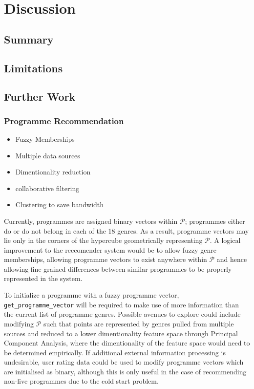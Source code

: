 \section{Discussion}
	\subsection{Summary}
	\subsection{Limitations}
	\subsection{Further Work}
		\subsubsection{Programme Recommendation}
		\label{sec:further_work_recommender}
		\begin{itemize}
			\item Fuzzy Memberships
			\item Multiple data sources
			\item Dimentionality reduction
			\item collaborative filtering
			\item Clustering to save bandwidth
		\end{itemize}

		Currently, programmes are assigned binary vectors within $\mathcal{P}$; programmes either do or do not belong in each of the 18 genres. As a result, programme vectors may lie only in the corners of the hypercube geometrically representing $\mathcal{P}$. A logical improvement to the reccomender system would be to allow fuzzy genre memberships, allowing programme vectors to exist anywhere within $\mathcal{P}$ and hence allowing fine-grained differences between similar programmes to be properly represented in the system.
		
		To initialize a programme with a fuzzy programme vector, \texttt{get\_programme\_vector} will be required to make use of more information than the current list of programme genres. Possible avenues to explore could include modifying $\mathcal{P}$ such that points are represented by genres pulled from multiple sources and reduced to a lower dimentionality feature space through Principal Component Analysis, where the dimentionality of the feature space would need to be determined empirically. If additional external information processing is undesirable, user rating data could be used to modify programme vectors which are initialised as binary, although this is only useful in the case of recommending non-live programmes due to the cold start problem\cite{cold-start-problem}.

